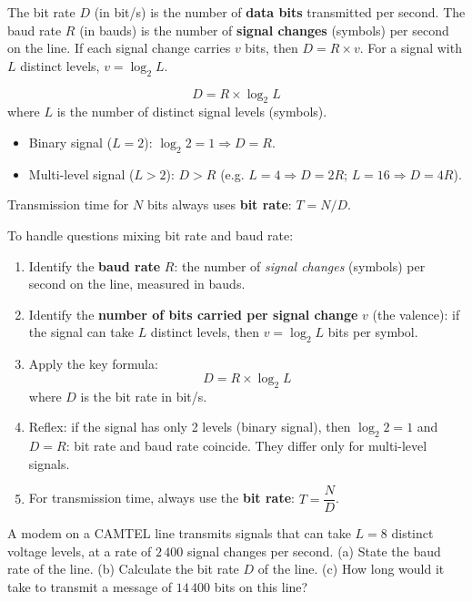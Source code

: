 \documentclass[11pt]{article}
\newcommand{\cle}[1]{{\popxbold\color{popdark}#1}}
\newcounter{popsec}
\newcounter{popsub}
\newcommand{\courssub}[1]{%
  \stepcounter{popsub}%
  \par\vspace{9pt}\noindent{\popxbold\fontsize{11.5}{13}\selectfont\color{popink}{\color{poporange}\thepopsec.\thepopsub}\hspace{6pt}#1}\par\nopagebreak\vspace{4pt}
}
\begin{document}
\courssub{Bit Rate and Baud Rate}

\begin{definition}
The \cle{bit rate} $D$ (in bit/s) is the number of \textbf{data bits} transmitted per second. The \cle{baud rate} $R$ (in bauds) is the number of \textbf{signal changes} (symbols) per second on the line. If each signal change carries $v$ bits, then $D = R \times v$. For a signal with $L$ distinct levels, $v = \log_2 L$.
\end{definition}

\begin{propriete}
\[ D = R \times \log_2 L \]
where $L$ is the number of distinct signal levels (symbols).
\begin{itemize}
\item Binary signal ($L=2$): $\log_2 2 = 1 \Rightarrow D = R$.
\item Multi-level signal ($L>2$): $D > R$ (e.g. $L=4 \Rightarrow D=2R$; $L=16 \Rightarrow D=4R$).
\end{itemize}
Transmission time for $N$ bits always uses \textbf{bit rate}: $T = N/D$.
\end{propriete}

\begin{methode}
To handle questions mixing \cle{bit rate} and \cle{baud rate}:
\begin{enumerate}
\item Identify the \textbf{baud rate} $R$: the number of \emph{signal changes} (symbols) per second on the line, measured in bauds.
\item Identify the \textbf{number of bits carried per signal change} $v$ (the valence): if the signal can take $L$ distinct levels, then $v = \log_2 L$ bits per symbol.
\item Apply the key formula:
\[ D = R \times \log_2 L \]
where $D$ is the bit rate in bit/s.
\item Reflex: if the signal has only 2 levels (binary signal), then $\log_2 2 = 1$ and $D = R$: bit rate and baud rate coincide. They differ only for multi-level signals.
\item For transmission time, always use the \textbf{bit rate}: $T = \dfrac{N}{D}$.
\end{enumerate}
\end{methode}

\begin{experience}
A modem on a CAMTEL line transmits signals that can take $L = 8$ distinct voltage levels, at a rate of $2\,400$ signal changes per second. (a) State the baud rate of the line. (b) Calculate the bit rate $D$ of the line. (c) How long would it take to transmit a message of $14\,400$ bits on this line?
\end{experience}
\end{document}
